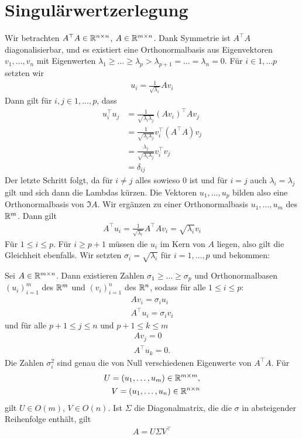 \documentclass{report}
\begin{document}
\section{Singulärwertzerlegung}
	Wir betrachten $A^\top A \in \mathbb{R}^{n \times n}$, $A \in \mathbb{R}^{m \times n}$.
	\newpar
	Dank Symmetrie ist $A^\top A$ diagonalisierbar, und es existiert eine Orthonormalbasis aus Eigenvektoren $v_1, \hdots, v_n$ mit Eigenwerten $\lambda_1 \geq \hdots \geq \lambda_p > \lambda_{p + 1} = \hdots = \lambda_{n} = 0$. Für $i \in 1, \hdots p$ setzten wir
	\begin{align*}
		u_i = \frac{1}{\sqrt{\lambda_i}} A v_i
	\end{align*} 
	Dann gilt für $i,j \in 1, \hdots, p$, dass
	\begin{align*}
		u_i^\top u_j &= \frac{1}{\sqrt{\lambda_i \lambda_j}}(Av_i)^\top Av_j\\
					 &= \frac{1}{\sqrt{\lambda_i \lambda_j}} v_i^\top (A^\top A)v_j\\
					 &= \frac{\lambda_j}{\sqrt{\lambda_i \lambda_j}} v_i^\top v_j\\
					 &= \delta_{ij}
	\end{align*}
	Der letzte Schritt folgt, da für $i \neq j$ alles sowieso $0$ ist und für $i = j$ auch $\lambda_i = \lambda_j$ gilt und sich dann die Lambdas kürzen.
	\newpar
	Die Vektoren $u_1, \hdots, u_p$ bilden also eine Orthonormalbasis von $\Im A$.
	Wir ergänzen zu einer Orthonormalbasis $u_1, \hdots, u_m$ des $\mathbb{R}^m$. Dann gilt
	\begin{align*}
		A^\top u_i = \frac{1}{\sqrt{\lambda_i}} A^\top A v_i = \sqrt{\lambda_i} v_i
	\end{align*}
	Für $1 \leq i \leq p$. Für $i \geq p+1$ müssen die $u_i$ im Kern von $A$ liegen, also gilt die Gleichheit ebenfalls. Wir setzten $\sigma_i = \sqrt{\lambda_i}$ für $i = 1, \hdots, p$ und bekommen:
	\begin{theorem}
		 Sei $A \in \mathbb{R}^{m \times n}$. Dann existieren Zahlen $\sigma_1 \geq \hdots \geq \sigma_p$ und Orthonormalbasen $(u_i)_{i = 1}^m$ des $\mathbb{R}^m$ und $(v_i)_{i = 1}^n$ des $\mathbb{R}^n$, sodass für alle $1 \leq i \leq p$:
		\begin{align*}
			Av_i = \sigma_i u_i\\ A^\top u_i = \sigma_i v_i
		\end{align*}
		und für alle $p+1 \leq j \leq n$ und $p+1 \leq k \leq m$
		\begin{align*}
			Av_j = 0\\ A^\top u_k = 0.
		\end{align*}
		Die Zahlen $\sigma_i^2$ sind genau die von Null verschiedenen Eigenwerte von $A^\top A$. Für
		\begin{align*}
			U = (u_1, \hdots, u_m) \in \mathbb{R}^{m \times m},\\
			V = (u_1, \hdots, u_n) \in \mathbb{R}^{n \times n}
		\end{align*}
		gilt $U \in O(m)$, $V \in O(n)$. Ist $\Sigma$ die Diagonalmatrix, die die $\sigma$ in absteigender Reihenfolge enthält, gilt
		\begin{align*}
			A = U \Sigma V^\top
		\end{align*}
	\end{theorem} 
\end{document}
